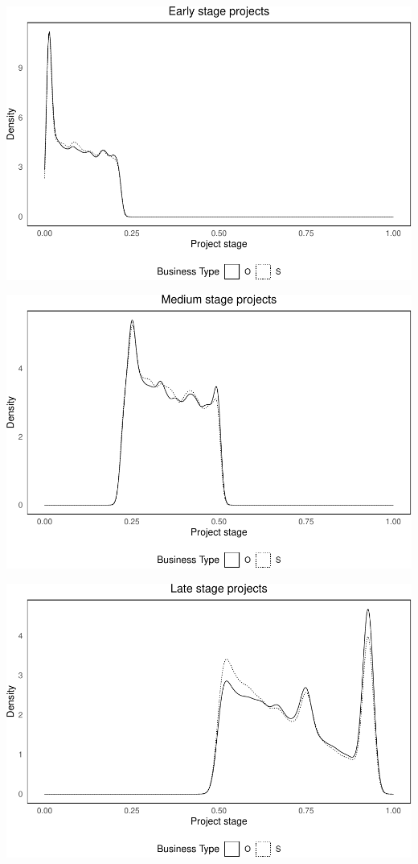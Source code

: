 \documentclass[
]{article}
\begin{document}
\includegraphics{qp_first_pc_delay-2_files/figure-latex/stage_plots_tercile_1-1.pdf}

\includegraphics{qp_first_pc_delay-2_files/figure-latex/stage_plots_tercile_2-1.pdf}

\includegraphics{qp_first_pc_delay-2_files/figure-latex/stage_plots_tercile_3-1.pdf}
\end{document}
